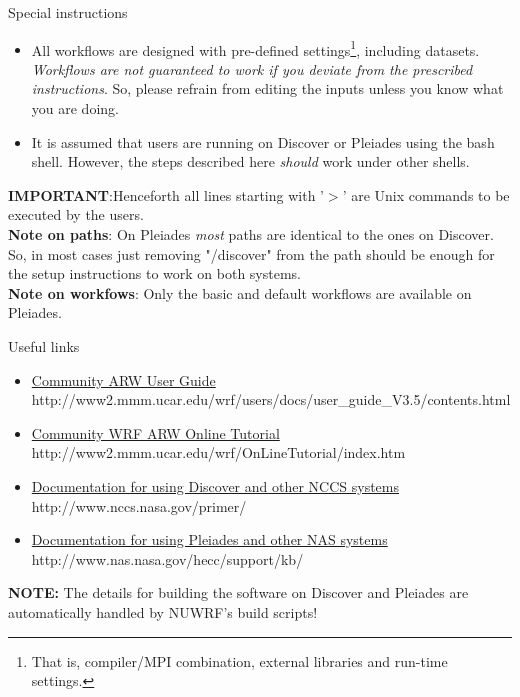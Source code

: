 \begin{frame}{Special instructions}

\footnotesize{
\begin{itemize}
\item All workflows are designed with pre-defined settings\footnote{That is, compiler/MPI combination, external libraries and run-time settings.}, including datasets. \emph{Workflows are not guaranteed to work if you deviate from the prescribed instructions}. So, please refrain from editing the inputs unless you know what you are doing. 
\item It is assumed that users are running on Discover or Pleiades using the bash shell. However, the steps described here \emph{should} work under other shells.
\end{itemize}
}
\textbf{IMPORTANT}:Henceforth all lines starting with '$>$' are Unix commands to be executed by the users.\\
\textbf{Note on paths}: On Pleiades \emph{most} paths are identical to the ones on Discover. So, in most cases just removing  "/discover" from the path should be enough for the setup instructions to work on both systems.\\
\textbf{Note on workfows}: Only the basic and default workflows are available on Pleiades.\\

\end{frame}


\begin{frame}{Useful links}

\footnotesize{
\begin{itemize}
\item \href{http://www2.mmm.ucar.edu/wrf/users/docs/user_guide_V3.5/contents.html}{Community ARW User Guide} http://www2.mmm.ucar.edu/wrf/users/docs/user\_guide\_V3.5/contents.html
\item \href{http://www2.mmm.ucar.edu/wrf/OnLineTutorial/index.htm}{Community WRF ARW Online Tutorial} http://www2.mmm.ucar.edu/wrf/OnLineTutorial/index.htm
\item \href{http://www.nccs.nasa.gov/primer/}{Documentation for using Discover and other NCCS systems} http://www.nccs.nasa.gov/primer/
\item \href{http://www.nas.nasa.gov/hecc/support/kb//}{Documentation for using Pleiades and other NAS systems} http://www.nas.nasa.gov/hecc/support/kb/
\end{itemize}
\textbf{NOTE:} The details for building the software on Discover and Pleiades are automatically handled by 
NUWRF's build scripts!
}

\end{frame}

